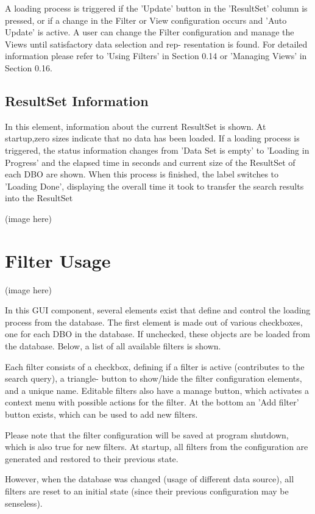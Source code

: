 \documentclass[10pt,letterpaper,extrafontsizes]{memoir}
\begin{document}
A loading process is triggered if the 'Update' button in the 'ResultSet' column is pressed, or if a change
in the Filter or View configuration occurs and 'Auto Update' is active.
A user can change the Filter configuration and manage the Views until satisfactory data selection and rep-
resentation is found. For detailed information please refer to 'Using Filters' in Section 0.14 or 'Managing
Views' in Section 0.16.

\subsection{ResultSet Information}
In this element, information about the current ResultSet is shown.  At startup,zero sizes indicate that no
data has been loaded.  If a loading process is triggered, the status information changes from 'Data Set is
empty' to 'Loading in Progress' and the elapsed time in seconds and current size of the ResultSet of each
DBO are shown.
When this process is finished, the label switches to 'Loading Done', displaying the overall time it took
to transfer the search results into the ResultSet

(image here)

\section{Filter Usage}
\label{sec:filter_usage}

(image here)

In this GUI component, several elements exist that define and control the loading process from the database.
The first element is made out of various checkboxes, one for each DBO in the database. If unchecked, these
objects are be loaded from the database. Below, a list of all available filters is shown.

Each filter consists of a checkbox, defining if a filter is active (contributes to the search query), a triangle-
button to show/hide the filter configuration elements, and a unique name. Editable filters also have a manage
button, which activates a context menu with possible actions for the filter.
At the bottom an 'Add filter' button exists, which can be used to add new filters.

Please note that the filter configuration will be saved at program shutdown, which is also true for new
filters.   At  startup,  all  filters  from  the  configuration  are  generated  and  restored  to  their  previous  state.

However, when the database was changed (usage of different data source), all filters are reset to an initial
state (since their previous configuration may be senseless).
\end{document}

